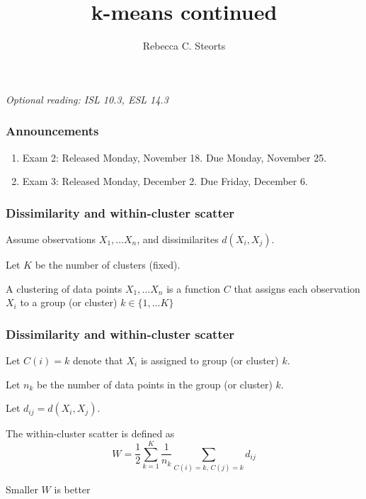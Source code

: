 \documentclass[mathserif]{beamer}
\def\half{\frac{1}{2}}
\def\R{\mathds{R}}
\def\blue{\color[rgb]{0,0,0.8}}
\begin{document}
\title{k-means continued}
\author{Rebecca C. Steorts}
\begin{frame}
\titlepage
{\it Optional reading: ISL 10.3, ESL 14.3}
\end{frame}

\begin{frame}
\frametitle{Announcements}
\begin{enumerate}
\item Exam 2: Released Monday, November 18. Due Monday, November 25.
\item Exam 3: Released Monday, December 2. Due Friday, December 6. 
\end{enumerate}
\end{frame}

\begin{frame}
\frametitle{Dissimilarity and within-cluster scatter}

Assume observations $X_1,\ldots X_n$, and 
{\blue dissimilarites} $d(X_i,X_j)$.
\bigskip


Let $K$ be the {\blue number of clusters} (fixed).
\bigskip

A {\blue clustering} of data points
$X_1,\ldots X_n$ is a function $C$ that
assigns each observation $X_i$ to a group (or cluster) $k \in \{1,\ldots K\}$
\end{frame}

\begin{frame}
\frametitle{Dissimilarity and within-cluster scatter}


Let $C(i)=k$ denote
that $X_i$ is assigned to group (or cluster) $k$. 

Let $n_k$ be the number of data points in the group (or cluster) $k$. 
 
Let $d_{ij}=d(X_i,X_j).$

\pause
\bigskip
The {\blue within-cluster scatter} is defined as 
$$W = \half \sum_{k=1}^K 
\frac{1}{n_k} \sum_{C(i)=k, \, C(j)=k} d_{ij}$$

\bigskip
Smaller $W$ is better
\end{frame}
\end{document}
